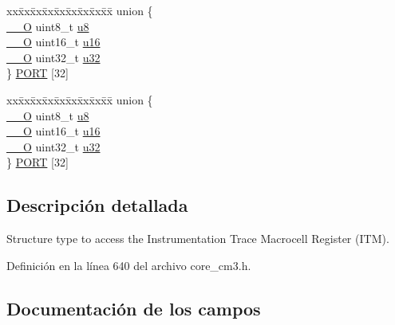 \begin{DoxyCompactItemize}
\item 
\begin{tabbing}
xx\=xx\=xx\=xx\=xx\=xx\=xx\=xx\=xx\=\kill
union \{\\
\>\hyperlink{core__sc300_8h_a7e25d9380f9ef903923964322e71f2f6}{\_\_O} uint8\_t \hyperlink{struct_i_t_m___type_a0374c0b98ab9de6f71fabff7412df832}{u8}\\
\>\hyperlink{core__sc300_8h_a7e25d9380f9ef903923964322e71f2f6}{\_\_O} uint16\_t \hyperlink{struct_i_t_m___type_ae8d499140220fa6d4eab1da7262bf08e}{u16}\\
\>\hyperlink{core__sc300_8h_a7e25d9380f9ef903923964322e71f2f6}{\_\_O} uint32\_t \hyperlink{struct_i_t_m___type_acaf6d0e14a3d4b541c624913b4a1931e}{u32}\\
\} \hyperlink{struct_i_t_m___type_a4fb8d5beccf8bf958357bf9d59856f05}{PORT} \mbox{[}32\mbox{]}\\

\end{tabbing}\item 
\begin{tabbing}
xx\=xx\=xx\=xx\=xx\=xx\=xx\=xx\=xx\=\kill
union \{\\
\>\hyperlink{core__sc300_8h_a7e25d9380f9ef903923964322e71f2f6}{\_\_O} uint8\_t \hyperlink{struct_i_t_m___type_a0374c0b98ab9de6f71fabff7412df832}{u8}\\
\>\hyperlink{core__sc300_8h_a7e25d9380f9ef903923964322e71f2f6}{\_\_O} uint16\_t \hyperlink{struct_i_t_m___type_ae8d499140220fa6d4eab1da7262bf08e}{u16}\\
\>\hyperlink{core__sc300_8h_a7e25d9380f9ef903923964322e71f2f6}{\_\_O} uint32\_t \hyperlink{struct_i_t_m___type_acaf6d0e14a3d4b541c624913b4a1931e}{u32}\\
\} \hyperlink{struct_i_t_m___type_aa6d310cc8eabd3413456ed2c6d28435e}{PORT} \mbox{[}32\mbox{]}\\

\end{tabbing}\end{DoxyCompactItemize}


\subsection{Descripción detallada}
Structure type to access the Instrumentation Trace Macrocell Register (I\+TM). 

Definición en la línea 640 del archivo core\+\_\+cm3.\+h.



\subsection{Documentación de los campos}

